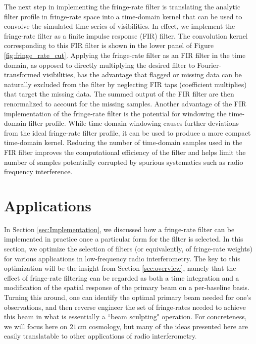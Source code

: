 \documentclass[twocolumn,apj,numberedappendix]{emulateapj}
\begin{document}
The next step in implementing the fringe-rate filter is translating the analytic filter profile in fringe-rate space into 
a time-domain kernel that can be used to convolve the simulated time series of visibilities.  In effect, we implement
the fringe-rate filter as a finite impulse response (FIR) filter.  The convolution kernel corresponding to this FIR
filter is shown in the lower panel of Figure \ref{fig:fringe_rate_cut}.  Applying the fringe-rate filter as an FIR filter in
the time domain, as opposed to directly multiplying the desired filter to Fourier-transformed visibilities, has the advantage 
that flagged or missing data can be naturally excluded from the filter by neglecting
FIR taps (coefficient multiplies) that target the missing data. The summed output of the FIR filter are then renormalized to
account for the missing samples.  Another advantage of the FIR implementation of the fringe-rate filter is the potential for
windowing the time-domain filter profile.  While time-domain windowing causes further deviations from the ideal
fringe-rate filter profile, it can be used to produce a more compact time-domain kernel.
Reducing the number of time-domain samples used in the FIR filter improves the computational efficiency of the filter and
helps limit the number of samples potentially corrupted by spurious systematics such as radio frequency interference.


\section{Applications}
\label{sec:bmsculpt}

In Section \ref{sec:Implementation}, we discussed how a fringe-rate filter can be implemented in practice once a particular form for the filter is selected. In this section, we optimize the selection of filters (or equivalently, of fringe-rate weights) for various applications in low-frequency radio interferometry. The key to this optimization will be the insight from Section \ref{sec:overview}, namely that the effect of fringe-rate filtering can be regarded as both a time integration and a modification of the spatial response of the primary beam on a per-baseline basis. Turning this around, one can identify the optimal primary beam needed for one's observations, and then reverse engineer the set of fringe-rates needed to achieve this beam in what is essentially a ``beam sculpting" operation. For concreteness, we will focus here on $21\,\textrm{cm}$ cosmology, but many of the ideas presented here are easily translatable to other applications of radio interferometry.
\end{document}
